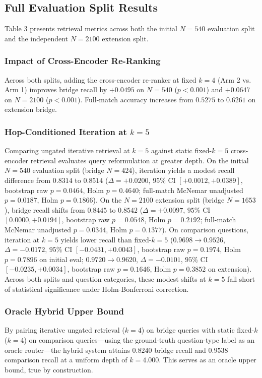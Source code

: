 \documentclass{article}
\begin{document}
\subsection{Full Evaluation Split Results}
Table 3 presents retrieval metrics across both the initial $N=540$ evaluation split and the independent $N=2100$ extension split.

\subsubsection{Impact of Cross-Encoder Re-Ranking}
Across both splits, adding the cross-encoder re-ranker at fixed $k=4$ (Arm 2 vs. Arm 1) improves bridge recall by $+0.0495$ on $N=540$ ($p < 0.001$) and $+0.0647$ on $N=2100$ ($p < 0.001$). Full-match accuracy increases from $0.5275$ to $0.6261$ on extension bridge.

\subsubsection{Hop-Conditioned Iteration at $k=5$}
Comparing ungated iterative retrieval at $k=5$ against static fixed-$k=5$ cross-encoder retrieval evaluates query reformulation at greater depth. On the initial $N=540$ evaluation split (bridge $N=424$), iteration yields a modest recall difference from $0.8314$ to $0.8514$ ($\Delta = +0.0200$, $95\%$ CI $[+0.0012, +0.0389]$, bootstrap raw $p = 0.0464$, Holm $p = 0.4640$; full-match McNemar unadjusted $p = 0.0187$, Holm $p = 0.1866$). On the $N=2100$ extension split (bridge $N=1653$), bridge recall shifts from $0.8445$ to $0.8542$ ($\Delta = +0.0097$, $95\%$ CI $[0.0000, +0.0194]$, bootstrap raw $p = 0.0548$, Holm $p = 0.2192$; full-match McNemar unadjusted $p = 0.0344$, Holm $p = 0.1377$). On comparison questions, iteration at $k=5$ yields lower recall than fixed-$k=5$ ($0.9698 \to 0.9526$, $\Delta = -0.0172$, $95\%$ CI $[-0.0431, +0.0043]$, bootstrap raw $p = 0.1974$, Holm $p = 0.7896$ on initial eval; $0.9720 \to 0.9620$, $\Delta = -0.0101$, $95\%$ CI $[-0.0235, +0.0034]$, bootstrap raw $p = 0.1646$, Holm $p = 0.3852$ on extension). Across both splits and question categories, these modest shifts at $k=5$ fall short of statistical significance under Holm-Bonferroni correction.


\subsubsection{Oracle Hybrid Upper Bound}
By pairing iterative ungated retrieval ($k=4$) on bridge queries with static fixed-$k$ ($k=4$) on comparison queries—using the ground-truth question-type label as an oracle router—the hybrid system attains $0.8240$ bridge recall and $0.9538$ comparison recall at a uniform depth of $k=4.000$. This serves as an oracle upper bound, true by construction.
\end{document}
